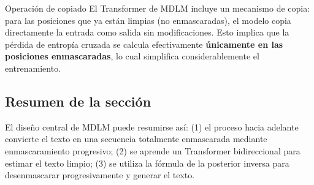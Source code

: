 \begin{knowledgebox}{Operación de copiado}
El Transformer de MDLM incluye un mecanismo de copia: para las posiciones que ya están limpias (no enmascaradas), el modelo copia directamente la entrada como salida sin modificaciones. Esto implica que la pérdida de entropía cruzada se calcula efectivamente \textbf{únicamente en las posiciones enmascaradas}, lo cual simplifica considerablemente el entrenamiento.
\end{knowledgebox}

\subsection{Resumen de la sección}

El diseño central de MDLM puede resumirse así: (1) el proceso hacia adelante convierte el texto en una secuencia totalmente enmascarada mediante enmascaramiento progresivo; (2) se aprende un Transformer bidireccional para estimar el texto limpio; (3) se utiliza la fórmula de la posterior inversa para desenmascarar progresivamente y generar el texto.

\newpage
